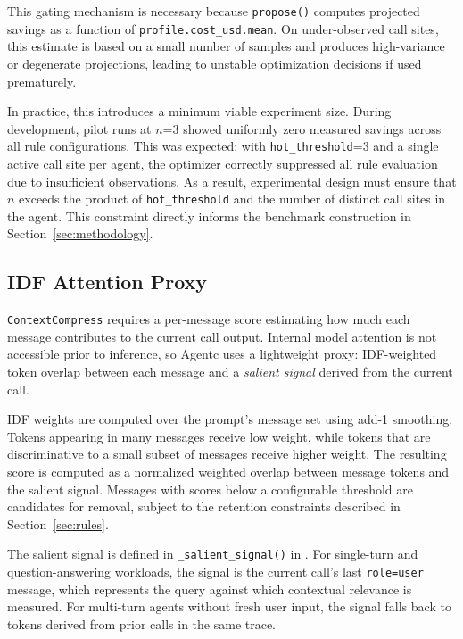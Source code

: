 This gating mechanism is necessary because \texttt{propose()} computes projected
savings as a function of \texttt{profile.cost\_usd.mean}. On under-observed call
sites, this estimate is based on a small number of samples and produces high-variance
or degenerate projections, leading to unstable optimization decisions if used
prematurely.

In practice, this introduces a minimum viable experiment size. During development,
pilot runs at $n$=3 showed uniformly zero measured savings across all rule
configurations. This was expected: with \texttt{hot\_threshold}=3 and a single active
call site per agent, the optimizer correctly suppressed all rule evaluation due to
insufficient observations. As a result, experimental design must ensure that $n$
exceeds the product of \texttt{hot\_threshold} and the number of distinct call sites
in the agent. This constraint directly informs the benchmark construction in
Section~\ref{sec:methodology}.

\subsection{IDF Attention Proxy}

\texttt{ContextCompress} requires a per-message score estimating how much each message
contributes to the current call output. Internal model attention is not accessible
prior to inference, so Agentc uses a lightweight proxy: IDF-weighted token overlap
between each message and a \textit{salient signal} derived from the current call.

IDF weights are computed over the prompt's message set using add-1 smoothing. Tokens
appearing in many messages receive low weight, while tokens that are discriminative to
a small subset of messages receive higher weight. The resulting score is computed as a
normalized weighted overlap between message tokens and the salient signal. Messages
with scores below a configurable threshold are candidates for removal, subject to the
retention constraints described in Section~\ref{sec:rules}.

The salient signal is defined in \texttt{\_salient\_signal()} in
. For single-turn and question-answering workloads,
the signal is the current call's last \texttt{role=user} message, which represents
the query against which contextual relevance is measured. For multi-turn agents
without fresh user input, the signal falls back to tokens derived from prior calls in
the same trace.

